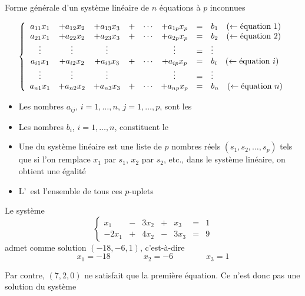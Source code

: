 \begin{frame}
\centerline{Forme générale d'un système linéaire de $n$ équations à $p$ inconnues}

$$\left\{
\begin{array}{cccccccl}
 a_{11}x_1 & +a_{12}x_2  &+a_{13}x_3&+&\cdots&+a_{1p}x_p&=&b_1 \quad 
(\leftarrow\hbox{équation  $1$})   \\
 a_{21}x_1 & +a_{22}x_2  &+a_{23}x_3&+&\cdots&+a_{2p}x_p&=&b_2 \quad 
(\leftarrow\hbox{équation  $2$})  \\
 \vdots &  \vdots  & \vdots&&& \vdots&=& \vdots   \\
 a_{i1}x_1 & +a_{i2}x_2  &+a_{i3}x_3&+&\cdots&+a_{ip}x_p&=&b_i \quad 
(\leftarrow\hbox{équation  $i$}) \\
 \vdots &  \vdots  & \vdots&&& \vdots&=& \vdots   \\
 a_{n1}x_1 & +a_{n2}x_2  &+a_{n3}x_3&+&\cdots&+a_{np}x_p&=&b_n \quad 
(\leftarrow\hbox{équation  $n$})  \\
   \end{array}
\right.
$$
\pause

\begin{itemize}
  \item Les nombres $a_{ij}$, $i=1,\ldots, n$, $j=1,\ldots, p$, sont les 
  
  \pause
  
  \item Les nombres $b_{i}$, $i=1,\ldots, n$, constituent le 
\end{itemize}


\end{frame}

\begin{frame}
\begin{mydefinition}
\begin{itemize}
  \item Une  du système linéaire est une liste de 
$p$ nombres réels $(s_1,s_2,\ldots,s_p)$ tels que si 
l'on remplace $x_1$ par $s_1$, $x_2$ par $s_2$, etc., dans le système 
linéaire, on obtient une égalité
  
  \pause
  
  \item L'\, 
est l'ensemble de tous ces $p$-uplets
  
\end{itemize}
\end{mydefinition}

\pause
\bigskip

Le système
\[ \left\{  \begin{array}{ccccccc}
 x_1 &- &3x_2 &+ &x_3 & =  &1\\
 -2x_1 &+ &4x_2 &- &3x_3 & =  &9
 \end{array} \right.
\]
admet comme solution $(-18,-6,1)$, c'est-à-dire 
$$ x_1=-18 \qquad\qquad x_2 = -6 \qquad\qquad x_3 = 1$$

\pause

Par contre, $(7,2,0)$ ne satisfait que la première équation. 
Ce n'est donc pas une solution du système


\end{frame}



